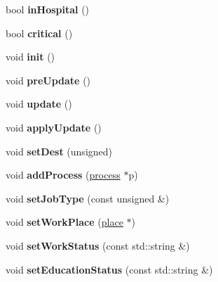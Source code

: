 \begin{DoxyCompactItemize}
\mbox{\label{classagent_ac10f380bcc7416f6b2dacaab82d6c7ed}} 
bool {\bfseries in\+Hospital} ()
\item 
\mbox{\label{classagent_a8da7d990a32c8b88ce57288b4ddb9dac}} 
bool {\bfseries critical} ()
\item 
\mbox{\label{classagent_a9b33e19cdc7822f578dd3ea84ae4247b}} 
void {\bfseries init} ()
\item 
\mbox{\label{classagent_a62677fb1d4e4cb968f297654a34bb2e9}} 
void {\bfseries pre\+Update} ()
\item 
\mbox{\label{classagent_ae20b0b8a169fb7a459c7b195bb970d80}} 
void {\bfseries update} ()
\item 
\mbox{\label{classagent_a30fdee285896c4918428d8713eb9f8b7}} 
void {\bfseries apply\+Update} ()
\item 
\mbox{\label{classagent_a4474a96ab84b2f4285d672142ac255d8}} 
void {\bfseries set\+Dest} (unsigned)
\item 
\mbox{\label{classagent_ab29f844fd10dbcd22271dc49da13970c}} 
void {\bfseries add\+Process} (\mbox{\hyperlink{classprocess}{process}} $\ast$p)
\item 
\mbox{\label{classagent_a89e017002b8df70ed9ccac07f7335f1a}} 
void {\bfseries set\+Job\+Type} (const unsigned \&)
\item 
\mbox{\label{classagent_a580f51ad01e693343049bc65e37eb319}} 
void {\bfseries set\+Work\+Place} (\mbox{\hyperlink{classplace}{place}} $\ast$)
\item 
\mbox{\label{classagent_a66caa39215e0fba347152cbf7190c85e}} 
void {\bfseries set\+Work\+Status} (const std\+::string \&)
\item 
\mbox{\label{classagent_afbfba46faf7104f44f19dfef8dd72585}} 
void {\bfseries set\+Education\+Status} (const std\+::string \&)
\item 
\mbox{\label{classagent_ad5a0596438a813a44840ad542416dc50}} 

\end{DoxyCompactItemize}
